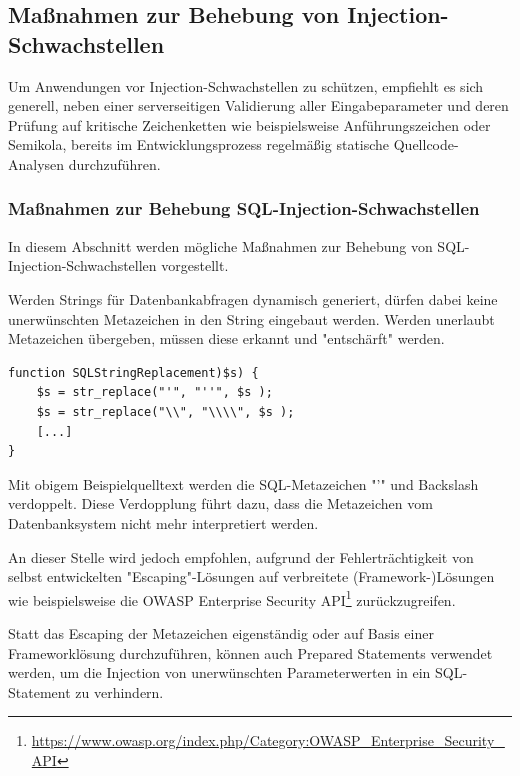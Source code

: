 \subsection{Maßnahmen zur Behebung von Injection-Schwachstellen}

Um Anwendungen vor Injection-Schwachstellen zu schützen, empfiehlt es 
sich generell, neben einer serverseitigen Validierung aller 
Eingabeparameter und deren Prüfung auf kritische Zeichenketten wie 
beispielsweise Anführungszeichen oder Semikola, bereits im 
Entwicklungsprozess regelmäßig statische Quellcode-Analysen 
durchzuführen.

\subsubsection{Maßnahmen zur Behebung SQL-Injection-Schwachstellen}
In diesem Abschnitt werden mögliche Maßnahmen zur Behebung von 
SQL-Injection-Schwachstellen vorgestellt.
\newpage
{}\label{escpace_metazeichen}

Werden Strings für Datenbankabfragen dynamisch generiert, dürfen dabei 
keine unerwünschten Metazeichen in den String eingebaut werden. Werden 
unerlaubt Metazeichen übergeben, müssen diese erkannt und "entschärft" 
werden.

\begin{lstlisting}[basicstyle=\ttfamily\footnotesize]
function SQLStringReplacement)$s) {
    $s = str_replace("'", "''", $s );
    $s = str_replace("\\", "\\\\", $s );
    [...]
}
\end{lstlisting}


Mit obigem Beispielquelltext werden die SQL-Metazeichen "'" und Backslash 
verdoppelt. Diese Verdopplung führt dazu, dass die Metazeichen vom 
Datenbanksystem nicht mehr interpretiert werden. 

An dieser Stelle wird jedoch empfohlen, aufgrund der Fehlerträchtigkeit 
von selbst entwickelten "Escaping"-Lösungen auf verbreitete 
(Framework-)Lösungen wie beispielsweise die OWASP Enterprise 
Security API\footnote{\url{https://www.owasp.org/index.php/Category:OWASP\_Enterprise\_Security\_API}} 
zurückzugreifen.


Statt das Escaping der Metazeichen eigenständig oder auf Basis einer 
Frameworklösung durchzuführen, können auch Prepared Statements verwendet 
werden, um die Injection von unerwünschten Parameterwerten in ein 
SQL-Statement zu verhindern.

